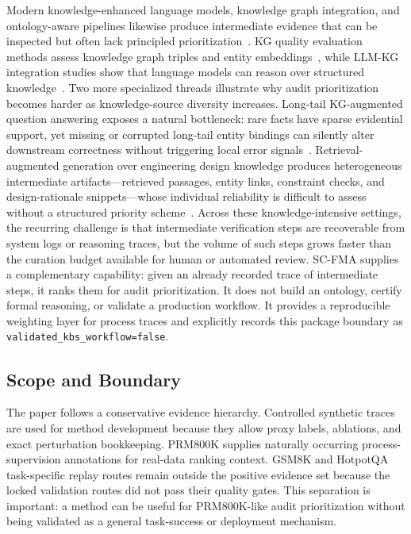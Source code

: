 \documentclass[a4paper,fleqn]{cas-sc}
\begin{document}
Modern knowledge-enhanced language models, knowledge graph integration, and ontology-aware pipelines likewise produce intermediate evidence that can be inspected but often lack principled prioritization~\cite{hu2024knowledgeenhanced,pan2024unifying,yang2025kbllmsurvey}. KG quality evaluation methods assess knowledge graph triples and entity embeddings~\cite{chen2025kgquality}, while LLM-KG integration studies show that language models can reason over structured knowledge~\cite{dai2025llmkg}. Two more specialized threads illustrate why audit prioritization becomes harder as knowledge-source diversity increases. Long-tail KG-augmented question answering exposes a natural bottleneck: rare facts have sparse evidential support, yet missing or corrupted long-tail entity bindings can silently alter downstream correctness without triggering local error signals~\cite{huang2025prompting}. Retrieval-augmented generation over engineering design knowledge produces heterogeneous intermediate artifacts---retrieved passages, entity links, constraint checks, and design-rationale snippets---whose individual reliability is difficult to assess without a structured priority scheme~\cite{siddharth2024retrieval}. Across these knowledge-intensive settings, the recurring challenge is that intermediate verification steps are recoverable from system logs or reasoning traces, but the volume of such steps grows faster than the curation budget available for human or automated review. SC-FMA supplies a complementary capability: given an already recorded trace of intermediate steps, it ranks them for audit prioritization. It does not build an ontology, certify formal reasoning, or validate a production workflow. It provides a reproducible weighting layer for process traces and explicitly records this package boundary as \texttt{validated\_kbs\_workflow=false}.

\subsection{Scope and Boundary}

The paper follows a conservative evidence hierarchy. Controlled synthetic traces are used for method development because they allow proxy labels, ablations, and exact perturbation bookkeeping. PRM800K supplies naturally occurring process-supervision annotations for real-data ranking context. GSM8K and HotpotQA task-specific replay routes remain outside the positive evidence set because the locked validation routes did not pass their quality gates. This separation is important: a method can be useful for PRM800K-like audit prioritization without being validated as a general task-success or deployment mechanism.
\end{document}
